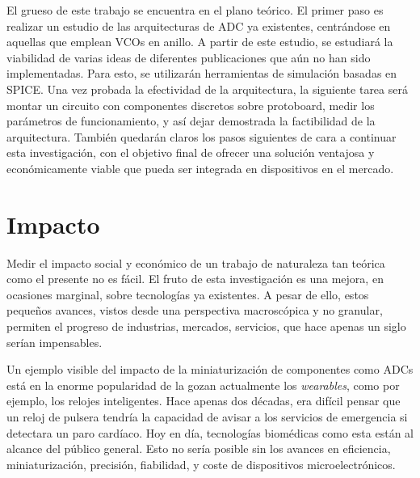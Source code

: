 \documentclass[12pt]{report} %
\begin{document}
	El grueso de este trabajo se encuentra en el plano teórico. El primer paso es realizar un estudio de las arquitecturas de ADC ya existentes, centrándose en aquellas que emplean VCOs en anillo. A partir de este estudio, se estudiará la viabilidad de varias ideas de diferentes publicaciones que aún no han sido implementadas. Para esto, se utilizarán herramientas de simulación basadas en SPICE. Una vez probada la efectividad de la arquitectura, la siguiente tarea será montar un circuito con componentes discretos sobre protoboard, medir los parámetros de funcionamiento, y así dejar demostrada la factibilidad de la arquitectura. También quedarán claros los pasos siguientes de cara a continuar esta investigación, con el objetivo final de ofrecer una solución ventajosa y económicamente viable que pueda ser integrada en dispositivos en el mercado.
	
	\section{Impacto}\label{st:impact}
	
	
	Medir el impacto social y económico de un trabajo de naturaleza tan teórica como el presente no es fácil. El fruto de esta investigación es una mejora, en ocasiones marginal, sobre tecnologías ya existentes. A pesar de ello, estos pequeños avances, vistos desde una perspectiva macroscópica y no granular, permiten el progreso de industrias, mercados, servicios, que hace apenas un siglo serían impensables.
	
	Un ejemplo visible del impacto de la miniaturización de componentes como ADCs está en la enorme popularidad de la gozan actualmente los \textit{wearables}, como por ejemplo, los relojes inteligentes. Hace apenas dos décadas, era difícil pensar que un reloj de pulsera tendría la capacidad de avisar a los servicios de emergencia si detectara un paro cardíaco. Hoy en día, tecnologías biomédicas como esta están al alcance del público general. Esto no sería posible sin los avances en eficiencia, miniaturización, precisión, fiabilidad, y coste de dispositivos microelectrónicos. 
	
\end{document}
